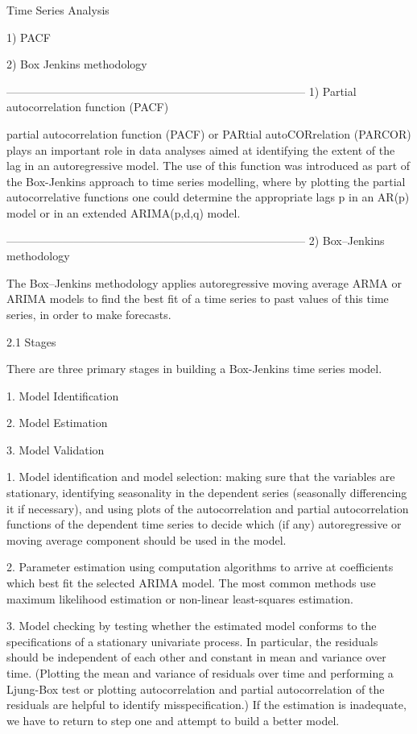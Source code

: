 
Time Series Analysis


1) PACF

2) Box Jenkins methodology




--------------------------------------------------------------------------------
1) Partial autocorrelation function (PACF) 

partial autocorrelation function (PACF) or PARtial autoCORrelation (PARCOR) plays an important role in data analyses aimed at identifying the extent of the lag in an autoregressive model. The use of this function was introduced as part of the Box-Jenkins approach to time series modelling, where by plotting the partial autocorrelative functions one could determine the appropriate lags p in an AR(p) model or in an extended ARIMA(p,d,q) model.




--------------------------------------------------------------------------------
2) Box–Jenkins methodology

The Box–Jenkins methodology applies autoregressive moving average ARMA or ARIMA models to find the best fit of a time series to past values of this time series, in order to make forecasts.


2.1 Stages


There are three primary stages in building a Box-Jenkins time series model.

1. Model Identification

2. Model Estimation

3. Model Validation


1. Model identification and model selection: making sure that the variables are stationary, identifying seasonality in the dependent series (seasonally differencing it if necessary), and using plots of the autocorrelation and partial autocorrelation functions of the dependent time series to decide which (if any) autoregressive or moving average component should be used in the model.


2. Parameter estimation using computation algorithms to arrive at coefficients which best fit the selected ARIMA model. The most common methods use maximum likelihood estimation or non-linear least-squares estimation.


3. Model checking by testing whether the estimated model conforms to the specifications of a stationary univariate process. In particular, the residuals should be independent of each other and constant in mean and variance over time. (Plotting the mean and variance of residuals over time and performing a Ljung-Box test or plotting autocorrelation and partial autocorrelation of the residuals are helpful to identify misspecification.) If the estimation is inadequate, we have to return to step one and attempt to build a better model.

